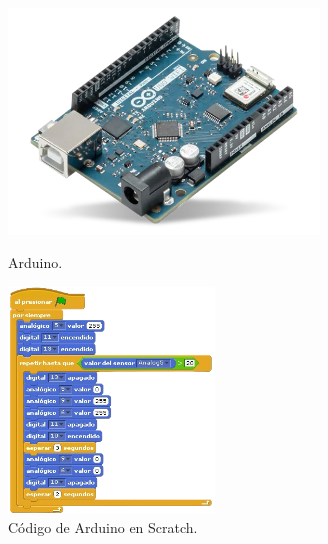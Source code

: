\begin{figure}[h!]
  \centering
  \begin{minipage}{0.45\textwidth}
    \centering
    \includegraphics[height=6cm]{figs/arduino}
    \caption{Arduino.}
    \label{fig:arduino}
  \end{minipage}
  \hfill
  \begin{minipage}{0.45\textwidth}
    \centering
    \includegraphics[height=6cm]{figs/scratch_arduino_code}
    \caption{Código de Arduino en Scratch.}
    \label{fig:scratch}
  \end{minipage}
\end{figure}\

